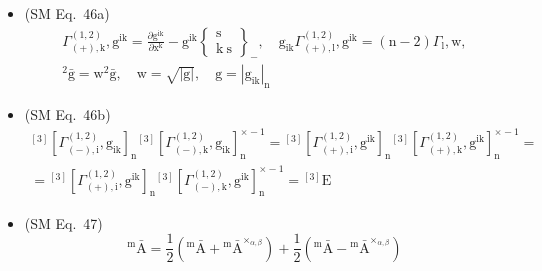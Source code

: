 \documentclass[12pt]{article}
\begin{document}
\begin{itemize}[label={},leftmargin=0pt]
    \item (SM Eq.\ 46a) 
    \[
    \begin{gathered}
    \Gamma^{(1,2)}_{(+),\mathrm{k}}, \mathrm{g}^{\mathrm{ik}} = \frac{\partial \mathrm{g}^{\mathrm{ik}}}{\partial \mathrm{x^k}} - \mathrm{g}^{\mathrm{ik}} \left\{ \begin{smallmatrix} \mathrm{s} \\ \mathrm{k\ s} \end{smallmatrix} \right\}_-, \quad \mathrm{g}_{\mathrm{ik}} \Gamma^{(1,2)}_{(+),\mathrm{l}}, \mathrm{g}^{\mathrm{ik}} = (\mathrm{n}-2) \Gamma_\mathrm{l}, \mathrm{w}, \\
    {}^2\bar{\mathrm{g}} = \mathrm{w}^2 \bar{\mathrm{g}}, \quad \mathrm{w} = \sqrt{|\mathrm{g}|}, \quad \mathrm{g} = |\mathrm{g}_{\mathrm{ik}}|_\mathrm{n}
    \end{gathered}
    \]

    \item (SM Eq.\ 46b) 
    \[
    \begin{gathered}
    {}^{[3]}\left[ \Gamma^{(1,2)}_{(-),\mathrm{i}}, \mathrm{g}_{\mathrm{ik}} \right]_\mathrm{n} {}^{[3]}\left[ \Gamma^{(1,2)}_{(-),\mathrm{k}}, \mathrm{g}_{\mathrm{ik}} \right]_\mathrm{n}^{\times -1} = {}^{[3]}\left[ \Gamma^{(1,2)}_{(+),\mathrm{i}}, \mathrm{g}^{\mathrm{ik}} \right]_\mathrm{n} {}^{[3]}\left[ \Gamma^{(1,2)}_{(+),\mathrm{k}}, \mathrm{g}^{\mathrm{ik}} \right]_\mathrm{n}^{\times -1} = \\
    = {}^{[3]}\left[ \Gamma^{(1,2)}_{(+),\mathrm{i}}, \mathrm{g}^{\mathrm{ik}} \right]_\mathrm{n} {}^{[3]}\left[ \Gamma^{(1,2)}_{(-),\mathrm{k}}, \mathrm{g}^{\mathrm{ik}} \right]_\mathrm{n}^{\times -1} = {}^{[3]}\mathrm{E}
    \end{gathered}
    \]

    \item (SM Eq.\ 47) 
    \[
    {}^\mathrm{m}\bar{\mathrm{A}} = \frac{1}{2} \left( {}^\mathrm{m}\bar{\mathrm{A}} + {}^\mathrm{m}\bar{\mathrm{A}}^{\times_{\alpha,\beta}} \right) + \frac{1}{2} \left( {}^\mathrm{m}\bar{\mathrm{A}} - {}^\mathrm{m}\bar{\mathrm{A}}^{\times_{\alpha,\beta}} \right)
    \]


\end{itemize}
\end{document}
